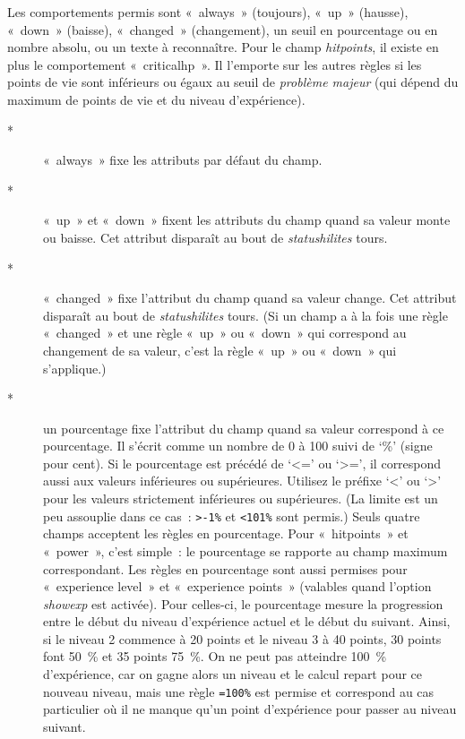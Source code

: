 \documentclass[titlepage]{article}
\begin{document}
Les comportements permis sont «~always~» (toujours),
«~up~» (hausse), «~down~» (baisse), «~changed~»
(changement), un seuil en pourcentage ou en nombre absolu, ou un texte à
reconnaître.
Pour le champ \textit{hitpoints}, il existe en plus le comportement
«~criticalhp~».
Il l'emporte sur les autres règles si les points de vie sont inférieurs ou
égaux au seuil de \textit{problème majeur} (qui dépend du maximum de points de
vie et du niveau d'expérience).

\begin{description}
\item[{*}]
«~always~» fixe les attributs par défaut du champ.

\item[{*}]
«~up~» et «~down~» fixent les attributs du champ quand sa
valeur monte ou baisse.
Cet attribut disparaît au bout de
\textit{statushilites}
tours.

\item[{*}]
«~changed~» fixe l'attribut du champ quand sa valeur change.
Cet attribut disparaît au bout de
\textit{statushilites}
tours.
(Si un champ a à la fois une règle «~changed~» et une règle
«~up~» ou «~down~» qui correspond au changement de sa
valeur, c'est la règle «~up~» ou «~down~» qui
s'applique.)

\item[{*}]
un pourcentage fixe l'attribut du champ quand sa valeur correspond à ce
pourcentage.
Il s'écrit comme un nombre de 0 à 100 suivi de `\%' (signe pour cent).
Si le pourcentage est précédé de `\textless{}=' ou `\textgreater{}=', il correspond
aussi aux valeurs inférieures ou supérieures.
Utilisez le préfixe `\textless{}' ou `\textgreater{}' pour les valeurs strictement
inférieures ou supérieures.
(La limite est un peu assouplie dans ce cas~: \texttt{\textgreater{}-1\%} et
\texttt{\textless{}101\%} sont permis.)
Seuls quatre champs acceptent les règles en pourcentage.
Pour «~hitpoints~» et «~power~», c'est simple~: le
pourcentage se rapporte au champ maximum correspondant.
Les règles en pourcentage sont aussi permises pour «~experience
level~» et «~experience points~» (valables quand l'option
\textit{showexp}
est activée).
Pour celles-ci, le pourcentage mesure la progression entre le début du
niveau d'expérience actuel et le début du suivant.
Ainsi, si le niveau 2 commence à 20 points et le niveau 3 à 40 points, 30
points font 50~\% et 35 points 75~\%.
On ne peut pas atteindre 100~\% d'expérience, car on gagne alors un niveau
et le calcul repart pour ce nouveau niveau, mais une règle
\texttt{=100\%} est permise et correspond au cas particulier où il ne manque
qu'un point d'expérience pour passer au niveau suivant.


\end{description}
\end{document}
